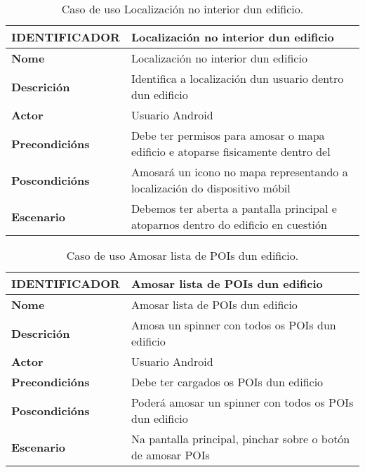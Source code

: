 \begin{table}[tbh]
	\footnotesize
	\centering
	\begin{tabular}{|l|p{10cm}|}
		\hline 
		\textbf{IDENTIFICADOR}	& \textbf{Localización no interior dun edificio} \\ 
		\hline 
		\textbf{Nome} & Localización no interior dun edificio \\ 
		\hline 
		\textbf{Descrición} & Identifica a localización dun usuario dentro dun edificio \\ 
		\hline 
		\textbf{Actor} & Usuario Android \\ 
		\hline 
		\textbf{Precondicións} & Debe ter permisos para amosar o mapa edificio e atoparse fisicamente dentro del \\ 
		\hline 
		\textbf{Poscondicións} & Amosará un icono no mapa representando a localización do dispositivo móbil \\ 
		\hline 
		\textbf{Escenario} & Debemos ter aberta a pantalla principal e atoparnos dentro do edificio en cuestión \\ 
		\hline 
	\end{tabular}
	\caption{Caso de uso Localización no interior dun edificio.}
	\label{tab:cuLocalizacion}
\end{table}

\begin{table}[tbh]
	\footnotesize
	\centering
	\begin{tabular}{|l|p{10cm}|}
		\hline 
		\textbf{IDENTIFICADOR}	& \textbf{Amosar lista de POIs dun edificio} \\ 
		\hline 
		\textbf{Nome} & Amosar lista de POIs dun edificio \\ 
		\hline 
		\textbf{Descrición} & Amosa un spinner con todos os POIs dun edificio \\ 
		\hline 
		\textbf{Actor} & Usuario Android \\ 
		\hline 
		\textbf{Precondicións} & Debe ter cargados os POIs dun edificio \\ 
		\hline 
		\textbf{Poscondicións} & Poderá amosar un spinner con todos os POIs dun edificio \\ 
		\hline 
		\textbf{Escenario} & Na pantalla principal, pinchar sobre o botón de amosar POIs \\ 
		\hline 
	\end{tabular}
	\caption{Caso de uso Amosar lista de POIs dun edificio.}
	\label{tab:cuAmosarListaPOI}
\end{table}

